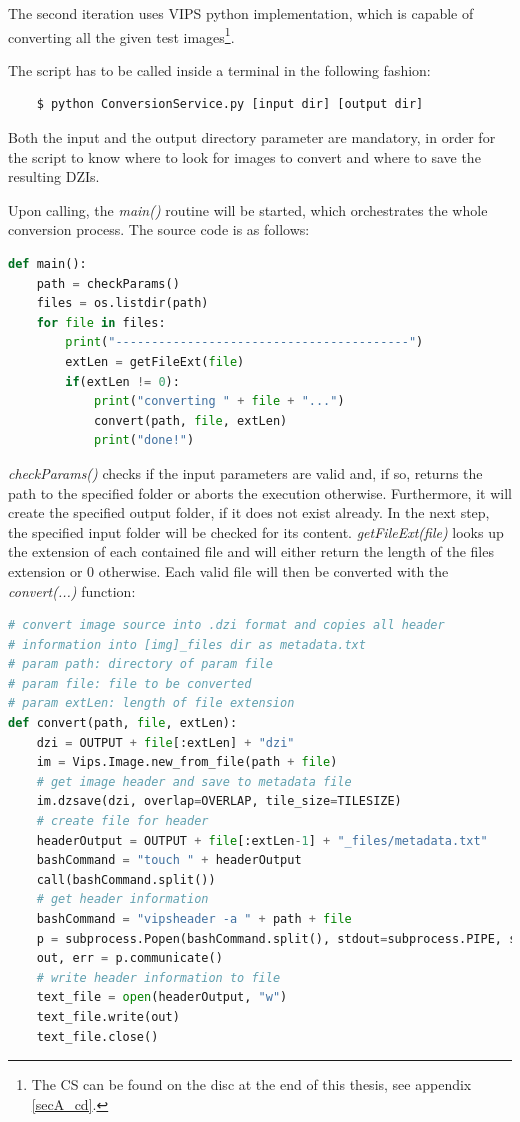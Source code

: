 The second iteration uses VIPS python implementation, which is capable of converting all the given test images\footnote{
	The CS can be found on the disc at the end of this thesis, see appendix \ref{secA_cd}.
}.

The script has to be called inside a terminal in the following fashion:

\begin{lstlisting}
	$ python ConversionService.py [input dir] [output dir]
\end{lstlisting}

Both the input and the output directory parameter are mandatory, in order for the script to know where to look for images to convert and where to save the resulting DZIs.

Upon calling, the \emph{main()} routine will be started, which orchestrates the whole conversion process. The source code is as follows:
\clearpage

\begin{lstlisting}[frame=single, language=python]
def main():
	path = checkParams()
	files = os.listdir(path)
	for file in files:
		print("-----------------------------------------")
		extLen = getFileExt(file)
		if(extLen != 0):
			print("converting " + file + "...")
			convert(path, file, extLen)
			print("done!")
\end{lstlisting}

\emph{checkParams()} checks if the input parameters are valid and, if so, returns the path to the specified folder or aborts the execution otherwise. Furthermore, it will create the specified output folder, if it does not exist already. In the next step, the specified input folder will be checked for its content. \emph{getFileExt(file)} looks up the extension of each contained file and will either return the length of the files extension or $0$ otherwise. Each valid file will then be converted with the \emph{convert(...)} function:

\begin{lstlisting}[frame=single, language=python]
# convert image source into .dzi format and copies all header 
# information into [img]_files dir as metadata.txt
# param path: directory of param file
# param file: file to be converted
# param extLen: length of file extension
def convert(path, file, extLen):
	dzi = OUTPUT + file[:extLen] + "dzi"
	im = Vips.Image.new_from_file(path + file)
	# get image header and save to metadata file
	im.dzsave(dzi, overlap=OVERLAP, tile_size=TILESIZE)
	# create file for header
	headerOutput = OUTPUT + file[:extLen-1] + "_files/metadata.txt"
	bashCommand = "touch " + headerOutput
	call(bashCommand.split())
	# get header information
	bashCommand = "vipsheader -a " + path + file
	p = subprocess.Popen(bashCommand.split(), stdout=subprocess.PIPE, stderr=subprocess.PIPE)
	out, err = p.communicate()
	# write header information to file
	text_file = open(headerOutput, "w")
	text_file.write(out)
	text_file.close()
\end{lstlisting}

